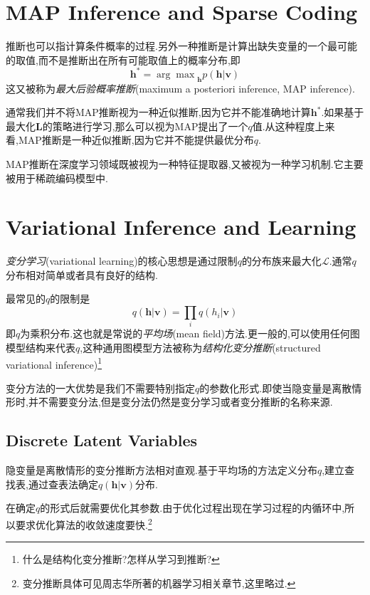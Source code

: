 \section{MAP Inference and Sparse Coding}

推断也可以指计算条件概率的过程.另外一种推断是计算出缺失变量的一个最可能的取值,而不是推断出在所有可能取值上的概率分布,即
\begin{equation}
\mathbf h^\ast={\arg\max}_{\mathbf h}p(\mathbf{h|v})
\end{equation}
这又被称为\textit{最大后验概率推断}(maximum a posteriori inference, MAP inference).

通常我们并不将MAP推断视为一种近似推断,因为它并不能准确地计算$\mathbf h^\ast$.如果基于最大化$\mathbf L$的策略进行学习,那么可以视为MAP提出了一个$q$值.从这种程度上来看,MAP推断是一种近似推断,因为它并不能提供最优分布$q$.

MAP推断在深度学习领域既被视为一种特征提取器,又被视为一种学习机制.它主要被用于稀疏编码模型中.

\section{Variational Inference and Learning}

\textit{变分学习}(variational learning)的核心思想是通过限制$q$的分布族来最大化$\mathcal L$.通常$q$分布相对简单或者具有良好的结构.

最常见的$q$的限制是
\begin{equation}
q(\mathbf{h|v})=\prod_iq(h_i|\mathbf v)
\end{equation}
即$q$为乘积分布.这也就是常说的\textit{平均场}(mean field)方法.更一般的,可以使用任何图模型结构来代表$q$,这种通用图模型方法被称为\textit{结构化变分推断}(structured variational inference)\footnote{什么是结构化变分推断?怎样从学习到推断?}

变分方法的一大优势是我们不需要特别指定$q$的参数化形式.即使当隐变量是离散情形时,并不需要变分法,但是变分法仍然是变分学习或者变分推断的名称来源.

\subsection{Discrete Latent Variables}

隐变量是离散情形的变分推断方法相对直观.基于平均场的方法定义分布$q$,建立查找表,通过查表法确定$q(\mathbf{h|v})$分布.

在确定$q$的形式后就需要优化其参数.由于优化过程出现在学习过程的内循环中,所以要求优化算法的收敛速度要快.\footnote{变分推断具体可见周志华所著的机器学习相关章节,这里略过.}

